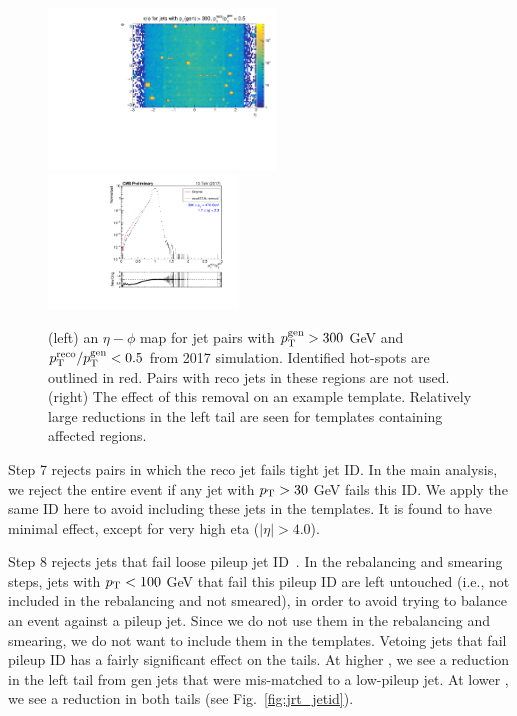 \begin{figure}[htbp]
  \begin{center}
    \includegraphics[width=0.54\textwidth]{figs/jetmet/ecalDeadCells.pdf}
    \includegraphics[width=0.45\textwidth]{figs/jetmet/compare_ecalDeadCell.pdf}
    \caption{(left) an $\eta-\phi$ map for jet pairs with $p_{\mathrm{T}}^\text{gen}> 300$ GeV and
    $p_{\mathrm{T}}^\text{reco}/p_{\mathrm{T}}^\text{gen} < 0.5$ from 2017 simulation. Identified hot-spots
    are outlined in red. Pairs with reco jets in these regions are not used.
    (right) The effect of this removal on an example template. Relatively large reductions
    in the left tail are seen for templates containing affected regions.
    }
    \label{fig:jrt_ecalDeadCell}
  \end{center}
\end{figure}

Step 7 rejects pairs in which the reco jet fails tight jet ID.
In the main analysis, we reject the entire event if any jet with $p_{\mathrm{T}}>30$ GeV
fails this ID. We apply the same ID here to avoid including these jets in 
the templates. It is found to have minimal effect, except for very high eta ($|\eta|>4.0$).

Step 8 rejects jets that fail loose pileup jet ID~\cite{JME_pileup_id}. In the rebalancing and smearing steps,
jets with $p_{\mathrm{T}}<100$ GeV that fail this pileup ID are left untouched (i.e., not included
in the rebalancing and not smeared), in order to avoid trying to balance an event
against a pileup jet. Since we do not use them in the rebalancing and smearing, 
we do not want to include them in the templates.
Vetoing jets that fail pileup ID has a fairly significant effect on the tails.
At higher \pt, we see a reduction in the left tail from gen jets that were
mis-matched to a low-\pt pileup jet. At lower \pt, we see a reduction in both tails
(see Fig.~\ref{fig:jrt_jetid}).

